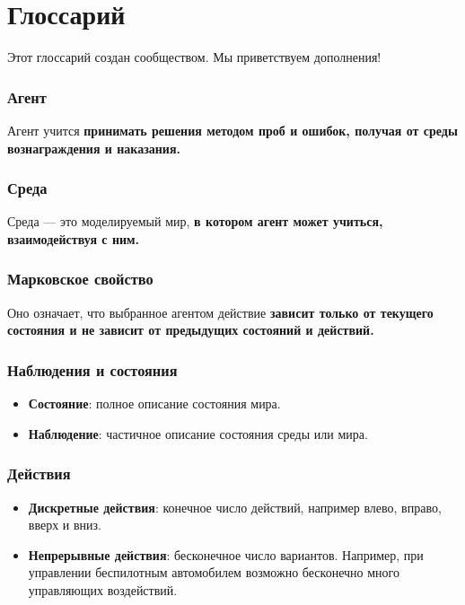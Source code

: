 \documentclass[11pt,a4paper]{article}
\begin{document}
\section{Глоссарий}\label{glossary}

Этот глоссарий создан сообществом. Мы приветствуем дополнения!

\subsubsection{Агент}\label{agent}

Агент учится \textbf{принимать решения методом проб и ошибок, получая от среды вознаграждения и наказания.}

\subsubsection{Среда}\label{environment}

Среда --- это моделируемый мир, \textbf{в котором агент может учиться, взаимодействуя с ним.}

\subsubsection{Марковское свойство}\label{markov-property-1}

Оно означает, что выбранное агентом действие \textbf{зависит только от текущего состояния и не зависит от предыдущих состояний и действий.}

\subsubsection{Наблюдения и состояния}\label{observationsstate}

\begin{itemize}
\tightlist
\item
  \textbf{Состояние}: полное описание состояния мира.
\item
  \textbf{Наблюдение}: частичное описание состояния среды или мира.
\end{itemize}

\subsubsection{Действия}\label{actions}

\begin{itemize}
\tightlist
\item
  \textbf{Дискретные действия}: конечное число действий, например влево, вправо, вверх и вниз.
\item
  \textbf{Непрерывные действия}: бесконечное число вариантов. Например, при управлении беспилотным автомобилем возможно бесконечно много управляющих воздействий.
\end{itemize}
\end{document}
